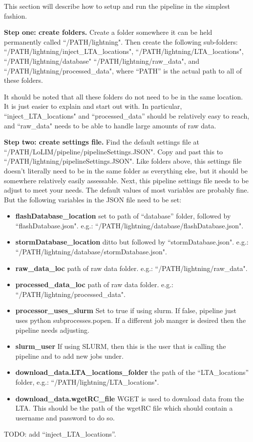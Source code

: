 \documentclass[]{article}
\begin{document}
This section will describe how to setup and run the pipeline in the simplest fashion. 

\textbf{Step one: create folders.} Create a folder somewhere it can be held permanently called ``/PATH/lightning". Then create the following sub-folders: ``/PATH/lightning/inject\_LTA\_locations", ``/PATH/lightning/LTA\_locations", ``/PATH/lightning/database" ``/PATH/lightning/raw\_data", and ``/PATH/lightning/processed\_data", where ``PATH'' is the actual path to all of these folders. 

It should be noted that all these folders do not need to be in the same location. It is just easier to explain and start out with. In particular, ``inject\_LTA\_locations" and ``processed\_data'' should be relatively easy to reach, and ``raw\_data" needs to be able to handle large amounts of raw data. 

\textbf{Step two: create settings file.} Find the default settings file at ``/PATH/LoLIM/pipeline/pipelineSettings.JSON". Copy and past this to ``/PATH/lightning/pipelineSettings.JSON". Like folders above, this settings file doesn't literally need to be in the same folder as everything else, but it should be somewhere relatively easily assessable. Next, this pipeline settings file needs to be adjust to meet your needs. The default values of most variables are probably fine. But the following variables in the JSON file need to be set:

\begin{itemize}
	\item \textbf{flashDatabase\_location} set to path of ``database'' folder, followed by ``flashDatabase.json". e.g.: ``/PATH/lightning/database/flashDatabase.json".
	\item \textbf{stormDatabase\_location} ditto but followed by ``stormDatabase.json". e.g.: ``/PATH/lightning/database/stormDatabase.json".
	\item \textbf{raw\_data\_loc} path of raw data folder. e.g.: ``/PATH/lightning/raw\_data".
	\item \textbf{processed\_data\_loc} path of raw data folder. e.g.: ``/PATH/lightning/processed\_data".
	\item \textbf{processor\_uses\_slurm} Set to true if using slurm. If false, pipeline just uses python subprocesses.popen. If a different job manger is desired then the pipeline needs adjusting.
	\item \textbf{slurm\_user} If using SLURM, then this is the user that is calling the pipeline and to add new jobs under.
	\item \textbf{download\_data.LTA\_locations\_folder} the path of the ``LTA\_locations'' folder, e.g.: ``/PATH/lightning/LTA\_locations".
	\item \textbf{download\_data.wgetRC\_file} WGET is used to download data from the LTA. This should be the path of the wgetRC file which should contain a username and password to do so.
\end{itemize}
TODO: add ``inject\_LTA\_locations''. 
\end{document}
